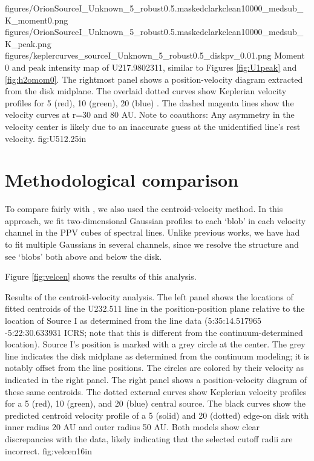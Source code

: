 \documentclass[twocolumn]{aastex61}
\begin{document}
\FigureThree
{{figures/OrionSourceI_Unknown_5_robust0.5.maskedclarkclean10000_medsub_K_moment0}.png}
{{figures/OrionSourceI_Unknown_5_robust0.5.maskedclarkclean10000_medsub_K_peak}.png}
{{figures/keplercurves_sourceI_Unknown_5_robust0.5_diskpv_0.01}.png}
{Moment 0 and peak intensity map of U217.9802311, similar to Figures \ref{fig:U1peak} and \ref{fig:h2omom0}.
The rightmost panel shows a position-velocity diagram extracted from the disk midplane.
The overlaid dotted curves show Keplerian velocity profiles for 5 (red), 10 (green), 20 (blue) \msun.
The dashed magenta lines show the velocity curves at r=30 and 80 AU.
{\color{red} Note to coauthors: Any asymmetry in the velocity center is likely due to an inaccurate
guess at the unidentified line's rest velocity.}
}
{fig:U5}{1}{2.25in}

\section{Methodological comparison}
To compare fairly with \citet{Plambeck2016a}, we also used the
centroid-velocity method.  In this approach, we fit two-dimensional Gaussian
profiles to each `blob' in each velocity channel in the PPV cubes of spectral
lines.  Unlike previous works, we have had to fit multiple Gaussians in several
channels, since we resolve the structure and see `blobs' both above and below
the disk.

Figure \ref{fig:velcen} shows the results of this analysis.

{Results of the centroid-velocity analysis.
The left panel shows the locations of fitted centroids of the U232.511 line in
the position-position plane relative to the location of Source I as determined
from the line data (5:35:14.517965 -5:22:30.633931 ICRS; note that this is
different from the continuum-determined location).  Source I's position is
marked with a grey circle at the center.  The grey line indicates the disk
midplane as determined from the continuum modeling; it is notably offset from
the line positions.  The circles are colored by their velocity as indicated in
the right panel.  The right panel shows a position-velocity diagram of these
same centroids.  The dotted external curves show Keplerian velocity profiles
for a 5 (red), 10 (green), and 20 (blue) \msun central source.  The black
curves show the predicted centroid velocity profile of a 5 \msun (solid) and 20
\msun (dotted) edge-on disk with inner radius 20 AU and outer radius 50 AU.
Both models show clear discrepancies with the data, likely indicating that
the selected cutoff radii are incorrect.
}
{fig:velcen}{1}{6in}
\end{document}
